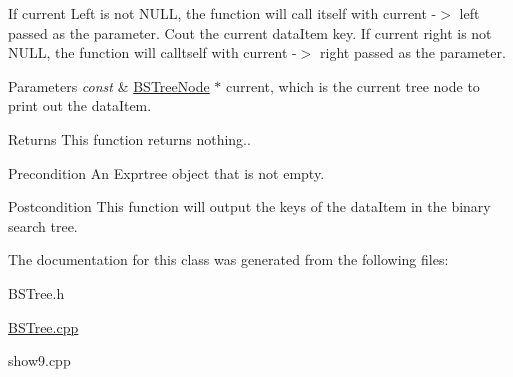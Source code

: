 If current Left is not N\+U\+LL, the function will call itself with current -\/$>$ left passed as the parameter. Cout the current data\+Item key. If current right is not N\+U\+LL, the function will calltself with current -\/$>$ right passed as the parameter.


\begin{DoxyParams}{Parameters}
{\em const} & \hyperlink{class_b_s_tree_1_1_b_s_tree_node}{B\+S\+Tree\+Node} $\ast$ current, which is the current tree node to print out the data\+Item. \\
\hline
\end{DoxyParams}
\begin{DoxyReturn}{Returns}
This function returns nothing..
\end{DoxyReturn}
\begin{DoxyPrecond}{Precondition}
An Exprtree object that is not empty. 
\end{DoxyPrecond}
\begin{DoxyPostcond}{Postcondition}
This function will output the keys of the data\+Item in the binary search tree. 
\end{DoxyPostcond}


The documentation for this class was generated from the following files\+:\begin{DoxyCompactItemize}
\item 
B\+S\+Tree.\+h\item 
\hyperlink{_b_s_tree_8cpp}{B\+S\+Tree.\+cpp}\item 
show9.\+cpp\end{DoxyCompactItemize}
